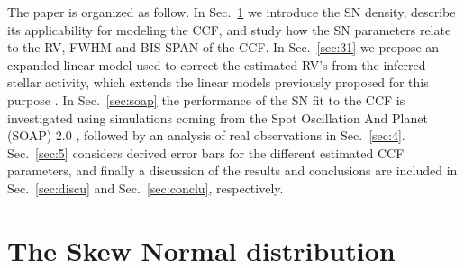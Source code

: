 \documentclass[11pt, oneside]{article}
\begin{document}

The paper is organized as follow. In Sec.~\ref{sec:2} we introduce the SN density, describe its applicability for modeling the CCF, and study how the SN parameters relate to the RV, FWHM and BIS SPAN of the CCF. 
%
In Sec.~\ref{sec:31} we propose an expanded linear model used to correct the estimated RV's from the inferred stellar activity, which extends the linear models previously proposed for this purpose \citep{Dumusque:2017aa,Feng:2017aa}. 
%
In Sec.~\ref{sec:soap} the performance of the SN fit to the CCF is investigated using simulations coming from the Spot Oscillation And Planet (SOAP) 2.0 \citep{Dumusque-2014b}, followed by an analysis of real observations in Sec.~\ref{sec:4}.
%
Sec.~\ref{sec:5} considers derived error bars for the different estimated CCF parameters, and finally a discussion of the results and conclusions are included in Sec.~\ref{sec:discu} and Sec.~\ref{sec:conclu}, respectively.

\section{The Skew Normal distribution} \label{sec:2}
\end{document}
